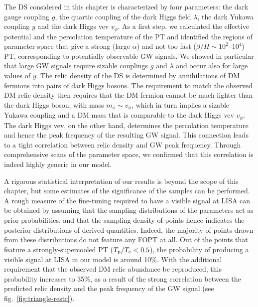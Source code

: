 The \ac{DS} considered in this chapter is characterized by four parameters: the dark gauge coupling $g$, the quartic coupling of the dark Higgs field $\lambda$, the dark Yukawa coupling $y$ and the dark Higgs \ac{vev} $v_\phi$. As a first step, we calculated the effective potential and the percolation temperature of the \ac{PT} and identified the regions of parameter space that give a strong (large $\alpha$) and not too fast ($\beta/H\sim10^2$--$10^4$) \ac{PT}, corresponding to potentially observable \ac{GW} signals. We showed in particular that large \ac{GW} signals require sizable couplings $g$ and $\lambda$ and occur also for large values of $y$.
%
The relic density of the \ac{DS} is determined by annihilations of \ac{DM} fermions into pairs of dark Higgs bosons. The requirement to match the observed \ac{DM} relic density then requires that the \ac{DM} fermion cannot be much lighter than the dark Higgs boson, with mass $m_\phi\sim v_\phi$, which in turn implies a sizable Yukawa coupling and a \ac{DM} mass that is comparable to the dark Higgs \ac{vev} $v_\phi$. The dark Higgs \ac{vev}, on the other hand,  determines the percolation temperature and hence the peak frequency of the resulting \ac{GW} signal. This connection leads to a tight correlation between relic density and \ac{GW} peak frequency. Through comprehensive scans of the parameter space, we confirmed that this correlation is indeed highly generic in our model.

A rigorous statistical interpretation of our results is beyond the scope of this chapter, but some estimates of the significance of the samples can be performed. A rough measure of the fine-tuning required to have a visible signal at \ac{LISA} can be obtained by assuming that   the sampling distributions of the parameters act as prior probabilities, and that the sampling density of points hence indicates the posterior distributions of derived quantities. Indeed, the majority of points drawn from these distributions do not feature any \ac{FOPT} at all. Out of the points that feature a strongly-supercooled \ac{PT} ($T_{\text{p}} / T_{\text{c}} < 0.5$), the probability of producing a visible signal at \ac{LISA} in our model is around 10\%. With the additional requirement that the observed \ac{DM} relic abundance be reproduced, this probability increases to 35\%, as a result of the strong correlation between the predicted relic density and the peak frequency of the \ac{GW} signal (see fig.~\ref{fig:triangle-restr}).


